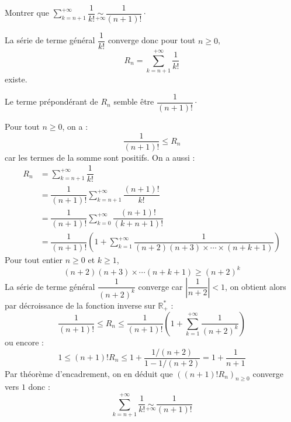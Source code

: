 \documentclass[a4paper,10pt]{report}
\newcommand{\Sum}[2]{\ensuremath{\textstyle{\sum\limits_{#1}^{#2}}}}
\begin{document}
\medskip


\begin{Exa} Montrer que $\Sum{k=n+1}{+ \infty} \dfrac{1}{k!} \underset{ + \infty}{\sim} \dfrac{1}{(n+1)!} \cdot$ \end{Exa}

\corr La série de terme général $\dfrac{1}{k!}$ converge donc pour tout $n \geq 0$,
$$ R_n = \sum_{k=n+1}^{+ \infty} \dfrac{1}{k!}$$
existe. 

\medskip

\noindent Le terme prépondérant de $R_n$ semble être $\dfrac{1}{(n+1)!}\cdot$

\medskip

\noindent Pour tout $n \geq 0$, on a :
$$ \dfrac{1}{(n+1)!} \leq R_n$$
car les termes de la somme sont positifs. On a aussi :
\begin{align*}
R_n & = \sum_{k=n+1}^{+ \infty} \dfrac{1}{k!} \\
& = \dfrac{1}{(n+1)!} \sum_{k=n+1}^{+ \infty} \dfrac{(n+1)!}{k!} \\
& = \dfrac{1}{(n+1)!} \sum_{k=0}^{+ \infty} \dfrac{(n+1)!}{(k+n+1)!} \\
& = \dfrac{1}{(n+1)!} \left(1 + \sum_{k=1}^{+ \infty} \dfrac{1}{(n+2)(n+3) \times \cdots \times (n+k+1)} \right)
\end{align*}
Pour tout entier $n \geq 0$ et $k \geq 1$,
$$ (n+2)(n+3) \times \cdots (n+k+1) \geq (n+2)^k$$
La série de terme général $\dfrac{1}{(n+2)^k}$ converge car $\left\vert \dfrac{1}{n+2} \right\vert<1$, on obtient alors par décroissance de la fonction inverse sur $\mathbb{R}_+^*$ :
$$ \dfrac{1}{(n+1)!} \leq R_n \leq \dfrac{1}{(n+1)!} \left(1+ \sum_{k=1}^{+ \infty} \dfrac{1}{(n+2)^k} \right)$$
ou encore :
$$ 1 \leq (n+1)! R_n \leq 1 + \dfrac{1/(n+2)}{1-1/(n+2)} = 1 + \dfrac{1}{n+1}$$
Par théorème d'encadrement, on en déduit que $((n+1)! R_n)_{n \geq 0}$ converge vers $1$ donc :
$$ \sum_{k=n+1}^{+ \infty} \dfrac{1}{k!} \underset{ + \infty}{\sim} \dfrac{1}{(n+1)!}$$
\end{document}
